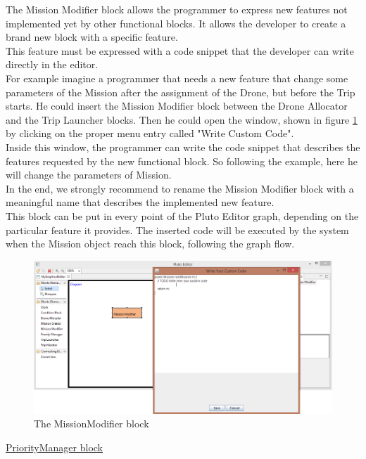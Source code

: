 The Mission Modifier block allows the programmer to express new features not implemented yet by other functional blocks.
It allows the developer to create a brand new block with a specific feature.
\\
This feature must be expressed with a code snippet that the developer can write directly in the editor.
\\
For example imagine a programmer that needs a new feature that change some parameters of the Mission after the assignment of the Drone, but before the Trip starts. 
He could insert the Mission Modifier block between the Drone Allocator and the Trip Launcher blocks. Then he could open the window, shown in figure \ref{fig:missionmodifier} by clicking on the proper menu entry called "Write Custom Code".
\\
Inside this window, the programmer can write the code snippet that describes the features requested by the new functional block. So following the example, here he will change the parameters of Mission.
\\
In the end, we strongly recommend to rename the Mission Modifier block with a meaningful name that describes the implemented new feature.
\\
This block can be put in every point of the Pluto Editor graph, depending on the particular feature it provides. The inserted code will be executed by the system when the Mission object reach this block, following the graph flow.
\\

\begin{figure}[H]
\centering
\includegraphics[width=\linewidth]
{pictures/MissionModifier.png}
  \caption{The MissionModifier block}
  \label{fig:missionmodifier}
\end{figure}

\newpage

\underline{PriorityManager block}
\\

